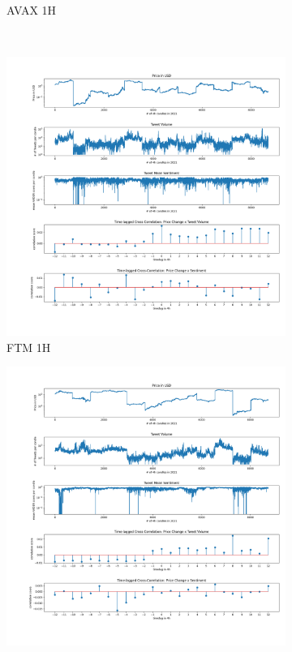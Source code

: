 \documentclass[11pt]{article}
\begin{document}
\begin{figure}[H]
\begin{subfigure}[b]{0.45\textwidth}
         \caption{AVAX 1H}
         \label{AVAX 1H}
     \end{subfigure} 
     \hfill \\
     \begin{subfigure}[b]{0.45\textwidth}
         \centering
         \includegraphics[width=\textwidth]{figures/crosscorrFTM_1h_range(-12, 13).png}
         \caption{FTM 1H}
         \label{ftm1h}
     \end{subfigure}
      \hfill 
     \begin{subfigure}[b]{0.45\textwidth}
         \centering
         \includegraphics[width=\textwidth]{figures/crosscorrSOL_1h_range(-12, 13).png}

\end{subfigure}
\end{figure}
\end{document}
